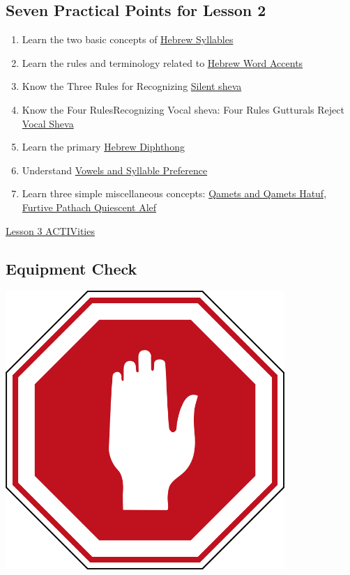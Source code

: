 \documentclass[
]{turabian-researchpaper}
\providecommand{\tightlist}{%
  \setlength{\itemsep}{0pt}\setlength{\parskip}{0pt}}
\begin{document}
\hypertarget{seven-practical-points-for-lesson-2-1}{%
\subsection*{Seven Practical Points for Lesson 2}\label{seven-practical-points-for-lesson-2-1}}

\begin{enumerate}
\def\labelenumi{\arabic{enumi}.}
\tightlist
\item
  Learn the two basic concepts of \protect\hyperlink{three_1}{Hebrew Syllables}
\item
  Learn the rules and terminology related to \protect\hyperlink{three_2}{Hebrew Word Accents}
\item
  Know the Three Rules for Recognizing \protect\hyperlink{three_3}{Silent sheva}
\item
  Know the Four RulesRecognizing Vocal sheva: Four Rules Gutturals Reject \protect\hyperlink{three_4}{Vocal Sheva}
\item
  Learn the primary \protect\hyperlink{three_5}{Hebrew Diphthong}
\item
  Understand \protect\hyperlink{three_6}{Vowels and Syllable Preference}
\item
  Learn three simple miscellaneous concepts: \protect\hyperlink{three_7}{Qamets and Qamets Hatuf, Furtive Pathach Quiescent Alef}
\end{enumerate}

\protect\hyperlink{three_8}{Lesson 3 ACTIVities}

\hypertarget{equipment-check-1}{%
\subsection*{Equipment Check}\label{equipment-check-1}}

\begin{center}\includegraphics[width=300pt]{images/stopil} \end{center}
\end{document}
